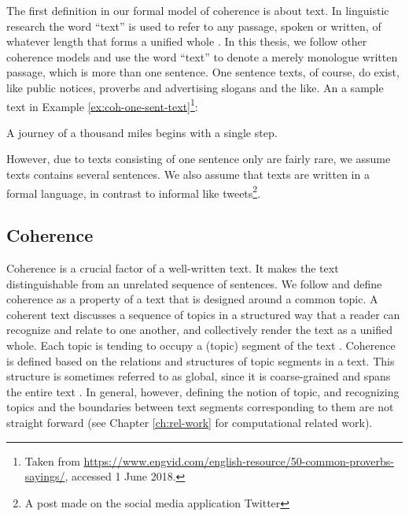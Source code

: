 The first definition in our formal model of coherence is about text. 
In linguistic research the word ``text'' is used to refer to any passage, spoken or written, of whatever length that forms a unified whole \cite{halliday76}. 
In this thesis, we follow other coherence models \cite{barzilay08,guinaudeau13} and use the word ``text'' to denote a merely monologue written passage, which is more than one sentence.
One sentence texts, of course, do exist, like public notices, proverbs and advertising slogans and the like. 
An a sample text in Example \ref{ex:coh-one-sent-text}\footnote{Taken from \url{https://www.engvid.com/english-resource/50-common-proverbs-sayings/}, accessed 1 June 2018.}: 

\begin{examples}
    \label{ex:coh-one-sent-text}
    A journey of a thousand miles begins with a single step.
\end{examples}

However, due to texts consisting of one sentence only are fairly rare, we assume texts contains several sentences.  
We also assume that texts are written in a formal language, in contrast to informal like tweets\footnote{A post made on the social media application Twitter}. 

\subsection{Coherence}

Coherence is a crucial factor of a well-written text. 
It makes the text distinguishable from an unrelated sequence of sentences. 
We follow  and define coherence as a property of a text that is designed around a common topic. 
A coherent text discusses a sequence of topics in a structured way that a reader can recognize and relate to one another, and collectively render the text as a unified whole. 
Each topic is tending to occupy a (topic) segment of the text \cite{hearst97}.  
Coherence is defined based on the relations and structures of topic segments in a text. 
This structure is sometimes referred to as global, since it is coarse-grained and spans the entire text \cite{}.  
In general, however, defining the notion of topic, and recognizing topics and the boundaries between  text segments corresponding to them are not straight forward \cite{stede12} (see Chapter \ref{ch:rel-work} for computational related work). 

